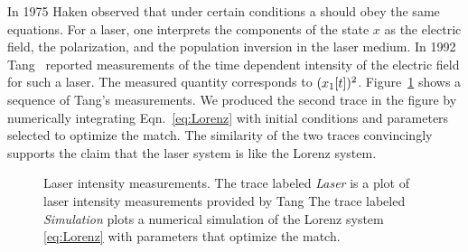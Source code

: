 In 1975 Haken\cite{Haken75} observed that under certain conditions a
 should obey the same equations.  For a laser, one
interprets the components of the state $x$ as the electric field, the
polarization, and the population inversion in the laser medium.  In
1992 %
%
Tang \etal\cite{Tang92,Tang94}\ reported measurements of the time %
dependent intensity of the electric field for such a laser.  The
measured quantity corresponds to $({x_1}{[t]})^2$. 
Figure~\ref{fig:LaserLP5} shows a sequence of Tang's measurements.  We
produced the second trace in the figure by numerically integrating
Eqn.~\eqref{eq:Lorenz} with initial conditions and parameters selected
to optimize the match.  The similarity of the two traces convincingly
supports the claim that the laser system is like the Lorenz system.
\begin{figure}[htbp]
  \caption[Laser intensity measurements.]%
  {Laser intensity measurements.  The trace labeled \emph{Laser} is a
    plot of laser intensity measurements provided by Tang \etal  The
    trace labeled \emph{Simulation} plots a numerical simulation of
    the Lorenz system \eqref{eq:Lorenz} with parameters  that optimize
    the match.}
  \label{fig:LaserLP5}
\end{figure}

